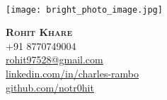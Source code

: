 \documentclass[A4,11pt]{article}
\begin{document}
\begin{comment}
In Europe it is common to include a picture of ones self in the CV. Select
which heading appropriate for the document you are creating.
\end{comment}

\begin{minipage}[c]{0.05\textwidth}
\-\
\end{minipage}
\begin{minipage}[c]{0.2\textwidth}
\texttt{[image: bright\_photo\_image.jpg]}
\hfill\vline\hfill
\end{minipage}
\begin{minipage}[c]{0.4\textwidth}
    \textbf{\Huge \scshape{Rohit Khare}} \\ \vspace{1pt} 
    \small{+91 8770749004} \\
    \href{mailto:rohit97528@gmail.com}{\underline{rohit97528@gmail.com}}\\
    \href{https://www.linkedin.com/in/charles-rambo/}{\underline{linkedin.com/in/charles-rambo}} \\
    \href{https://github.com/fizixmastr}{\underline{github.com/notr0hit}}
\end{minipage}

\end{document}

